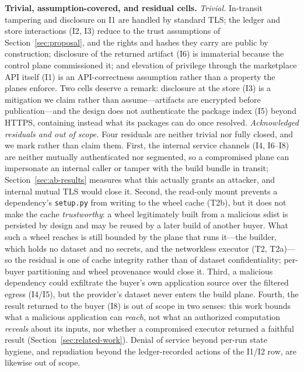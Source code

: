 \textbf{Trivial, assumption-covered, and residual cells.} \emph{Trivial.} In-transit
tampering and disclosure on I1 are handled by standard TLS; the ledger and store
interactions (I2, I3) reduce to the trust assumptions of Section~\ref{sec:proposal}, and the
rights and hashes they carry are public by construction; disclosure of the returned artifact
(I6) is immaterial because the control plane commissioned it; and elevation of privilege
through the marketplace API itself (I1) is an API-correctness assumption rather than a
property the planes enforce. Two cells deserve a remark: disclosure at the store (I3) is a
mitigation we claim rather than assume---artifacts are encrypted before publication---and
the design does not authenticate the package index (I5) beyond HTTPS, containing instead
what its packages can do once resolved. \emph{Acknowledged residuals and out of scope.} Four
residuals are neither trivial nor fully closed, and we mark rather than claim them. First,
the internal service channels (I4, I6--I8) are neither mutually authenticated nor segmented,
so a compromised plane can impersonate an internal caller or tamper with the build bundle in
transit; Section~\ref{sec:ab-results} measures what this actually grants an attacker, and
internal mutual TLS would close it. Second, the read-only mount prevents a dependency's
\texttt{setup.py} from writing to the wheel cache (T2b), but it does not make the cache
\emph{trustworthy}: a wheel legitimately built from a malicious sdist is persisted by design
and may be reused by a later build of another buyer. What such a wheel reaches is still
bounded by the plane that runs it---the builder, which holds no dataset and no secrets, and
the networkless executor (T2, T2a)---so the residual is one of cache integrity rather than
of dataset confidentiality; per-buyer partitioning and wheel provenance would close it.
Third, a malicious dependency could exfiltrate the buyer's own application source over the
filtered egress (I4/I5), but the provider's dataset never enters the build plane. Fourth,
the result returned to the buyer (I8) is out of scope in two senses: this work bounds what a
malicious application can \emph{reach}, not what an authorized computation \emph{reveals}
about its inputs, nor whether a compromised executor returned a faithful result
(Section~\ref{sec:related-work}). Denial of service beyond per-run state hygiene, and
repudiation beyond the ledger-recorded actions of the I1/I2 row, are likewise out of scope.

